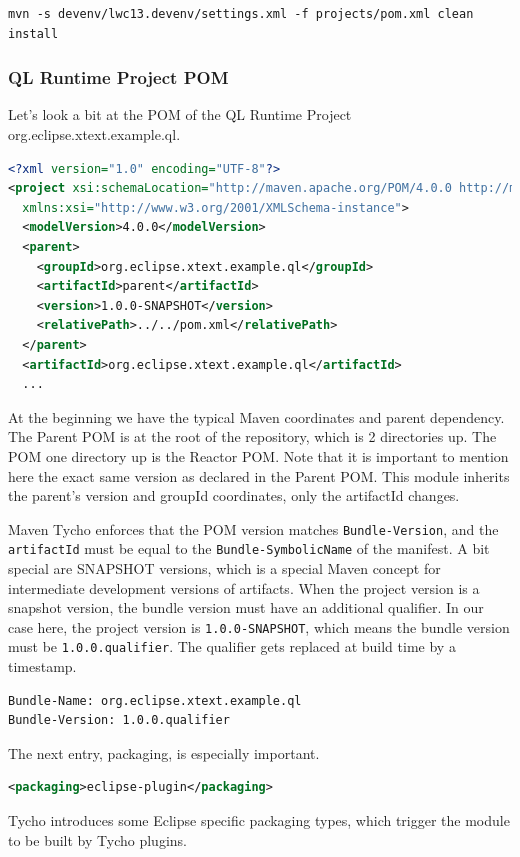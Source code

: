 \begin{lstlisting}
mvn -s devenv/lwc13.devenv/settings.xml -f projects/pom.xml clean install
\end{lstlisting}

\subsubsection{QL Runtime Project POM}
Let's look a bit at the POM of the QL Runtime Project
org.eclipse.xtext.example.ql.

\begin{lstlisting}[language=XML]
<?xml version="1.0" encoding="UTF-8"?>
<project xsi:schemaLocation="http://maven.apache.org/POM/4.0.0 http://maven.apache.org/xsd/maven-4.0.0.xsd" xmlns="http://maven.apache.org/POM/4.0.0"
  xmlns:xsi="http://www.w3.org/2001/XMLSchema-instance">
  <modelVersion>4.0.0</modelVersion>
  <parent>
    <groupId>org.eclipse.xtext.example.ql</groupId>
    <artifactId>parent</artifactId>
    <version>1.0.0-SNAPSHOT</version>
    <relativePath>../../pom.xml</relativePath>
  </parent>
  <artifactId>org.eclipse.xtext.example.ql</artifactId>
  ...
\end{lstlisting}

At the beginning we have the typical Maven coordinates and parent dependency.
The Parent POM is at the root of the repository, which is 2 directories up. The
POM one directory up is the Reactor POM. Note that it is important to mention
here the exact same version as declared in the Parent POM. This module inherits
the parent's version and groupId coordinates, only the artifactId changes.

Maven Tycho enforces that the POM version matches \texttt{Bundle-Version}, and
the \texttt{artifactId} must be equal to the \texttt{Bundle-SymbolicName} of the manifest. A bit
special are SNAPSHOT versions, which is a special Maven concept for intermediate
development versions of artifacts. When the project version is a snapshot
version, the bundle version must have an additional qualifier. In our case here,
the project version is \texttt{1.0.0-SNAPSHOT}, which means the bundle version must be
\texttt{1.0.0.qualifier}. The qualifier gets replaced at build time by a timestamp.

\begin{lstlisting}
Bundle-Name: org.eclipse.xtext.example.ql
Bundle-Version: 1.0.0.qualifier
\end{lstlisting}

The next entry, packaging, is especially important. 
\begin{lstlisting}[language=XML]
  <packaging>eclipse-plugin</packaging>
\end{lstlisting}
Tycho introduces some Eclipse specific packaging types, which trigger the module
to be built by Tycho plugins.

